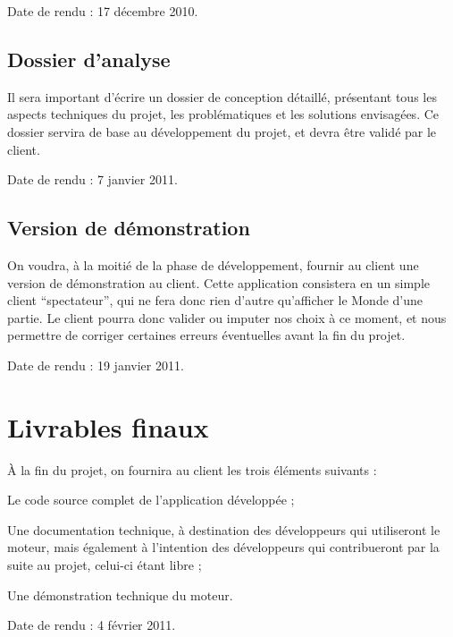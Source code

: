 \documentclass[a4paper,10pt]{report}
\begin{document}
      Date de rendu : 17 décembre 2010.
      
    \section{Dossier d'analyse}
    
      Il sera important d'écrire un dossier de conception détaillé, présentant tous les aspects techniques du projet, les problématiques et les solutions envisagées. Ce dossier servira de base au développement du projet, et devra être validé par le client. 
      
      Date de rendu : 7 janvier 2011.
      
    \section{Version de démonstration}
    
      On voudra, à la moitié de la phase de développement, fournir au client une version de démonstration au client. Cette application consistera en un simple client ``spectateur'', qui ne fera donc rien d'autre qu'afficher le Monde d'une partie. Le client pourra donc valider ou imputer nos choix à ce moment, et nous permettre de corriger certaines erreurs éventuelles avant la fin du projet. 
      
      Date de rendu : 19 janvier 2011. 



  \chapter{Livrables finaux}

    À la fin du projet, on fournira au client les trois éléments suivants : 
    
    \begin{list}{-}{}
      \item{Le code source complet de l'application développée ;}
      \item{Une documentation technique, à destination des développeurs qui utiliseront le moteur, mais également à l'intention des développeurs qui contribueront par la suite au projet, celui-ci étant libre ;}
      \item{Une démonstration technique du moteur.}
    \end{list}
    
    Date de rendu : 4 février 2011.
\end{document}
